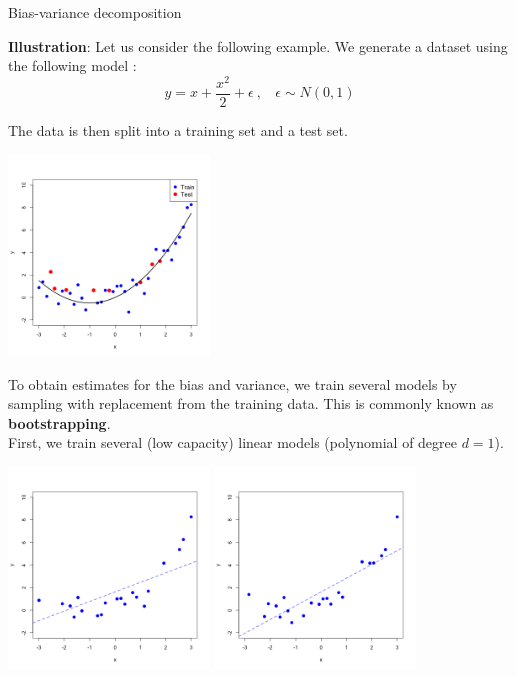 \documentclass[11pt,compress,t,notes=noshow, xcolor=table]{beamer}
\begin{document}
\begin{vbframe} {Bias-variance decomposition}
\framebreak

\textbf{Illustration}: Let us consider the following example. We generate a dataset using the following model : 
$$y = x + \frac{x^2}{2} + \epsilon  \ , \ \ \ \ \epsilon \sim 
N (0, 1)$$

The data is then split into a training set and a test set.

\begin{center}
  \includegraphics[width = 0.4\textwidth]{figure/bias_variance_decomposition-train_test.png}
\end{center}

\framebreak

To obtain estimates for the bias and variance, we train several models by sampling with replacement from the training data. This is commonly known as \textbf{bootstrapping}. \\
\vspace{0.3cm}
First, we train several (low capacity) linear models (polynomial of degree $d=1$).

\begin{center}
  \includegraphics[width = 0.4\textwidth]{figure/bias_variance_decomposition-bootstrap_1.png}
  \includegraphics[width = 0.4\textwidth]{figure/bias_variance_decomposition-bootstrap_2.png}
\end{center}


\end{vbframe}
\end{document}
